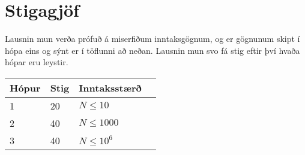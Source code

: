 \section*{Stigagjöf}
Lausnin mun verða prófuð á miserfiðum inntaksgögnum, og er gögnunum skipt í
hópa eins og sýnt er í töflunni að neðan. Lausnin mun svo fá stig eftir því
hvaða hópar eru leystir.

\begin{tabular}{|l|l|l|l|}
\hline
Hópur & Stig & Inntaksstærð \\ \hline
1     & 20   & $N \le 10$ \\ \hline
2     & 40   & $N \le 1000$ \\ \hline
3     & 40   & $N \le 10^6$ \\ \hline
\end{tabular}

